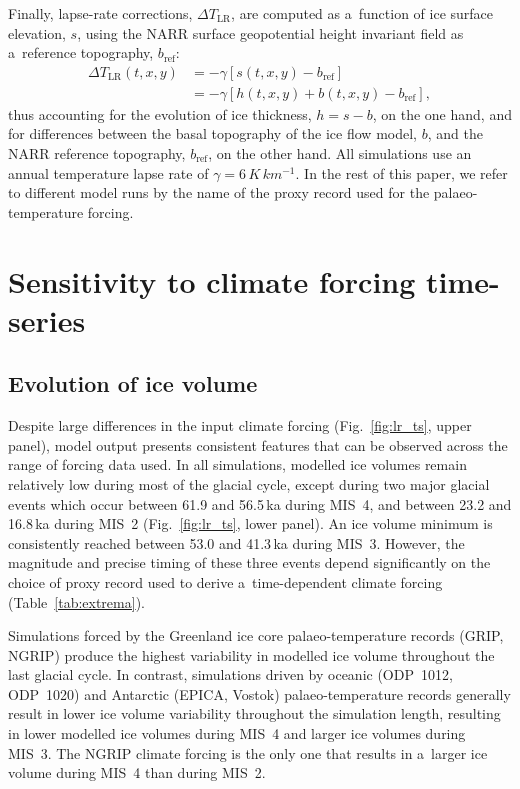 \documentclass[tc, manuscript]{copernicus}
\begin{document}
      Finally, lapse-rate corrections, ${\Delta}T_{\text{LR}}$, are computed
      as a~function of ice surface elevation, $s$, using the NARR surface
      geopotential height invariant field as a~reference topography,
      $b_{\text{ref}}$:
\begin{align}
{\Delta}T_{\text{LR}}(t, x, y) &= -\gamma [s(t, x, y)-b_{\text{ref}}] \\
                            &= -\gamma [h(t, x, y)+b(t, x, y)-b_{\text{ref}}],
\end{align}
      thus accounting for the evolution of ice thickness, ${h=s-b}$, on the
      one hand, and for differences between the basal topography of the ice
      flow model, $b$, and the NARR reference topography, $b_{\text{ref}}$,
      on the other hand. All simulations use an annual temperature lapse
      rate of $\gamma = 6\,\unit{K\,km^{-1}}$. In the rest of this paper, we
      refer to different model runs by the name of the proxy record used for
      the palaeo-temperature forcing.

\section{Sensitivity to climate forcing time-series}
\label{sec:results}

\subsection{Evolution of ice volume}



      Despite large differences in the input climate forcing
      (Fig.~\ref{fig:lr_ts}, upper panel), model output presents consistent
      features that can be observed across the range of forcing data used.
      In all simulations, modelled ice volumes remain relatively low during
      most of the glacial cycle, except during two major glacial events
      which occur between 61.9 and 56.5\,\unit{ka} during MIS~4, and between
      23.2 and 16.8\,\unit{ka} during MIS~2 (Fig.~\ref{fig:lr_ts}, lower
      panel). An ice volume minimum is consistently reached between 53.0 and
      41.3\,\unit{ka} during MIS~3. However, the magnitude and precise
      timing of these three events depend significantly on the choice of
      proxy record used to derive a~time-dependent climate forcing
      (Table~\ref{tab:extrema}).

      Simulations forced by the Greenland ice core palaeo-temperature
      records (GRIP, NGRIP) produce the highest variability in modelled ice
      volume throughout the last glacial cycle. In contrast, simulations
      driven by oceanic (ODP~1012, ODP~1020) and Antarctic (EPICA, Vostok)
      palaeo-temperature records generally result in lower ice volume
      variability throughout the simulation length, resulting in lower
      modelled ice volumes during MIS~4 and larger ice volumes during MIS~3.
      The NGRIP climate forcing is the only one that results in a~larger ice
      volume during MIS~4 than during MIS~2.
\end{document}
